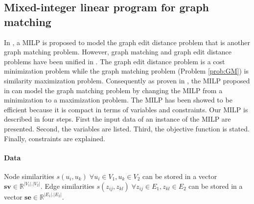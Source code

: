 \documentclass[times,onecolumn,final,authoryear]{article}
\theoremstyle{definition}
\begin{document}
\subsection{Mixed-integer linear program for graph matching}
In \cite{Lerouge2017NewBL}, a MILP is proposed to model the graph edit distance problem that is another graph matching problem. However, graph matching and graph edit distance problems have been unified in \cite{DBLP:journals/prl/Raveaux21}. The graph edit distance problem is a cost minimization problem while the graph matching problem (Problem \ref{prob:GM}) is similarity maximization problem.
Consequently as proven in \cite{DBLP:journals/prl/Raveaux21}, the MILP proposed in \cite{Lerouge2017NewBL} can model the graph matching problem by changing the MILP from a minimization to a maximization problem. The MILP has been showed to be efficient because it is compact in terms of variables and constraints. 
Our MILP is described in four steps. First the input data of an instance of the MILP are presented. Second, the variables are listed. Third, the objective function is stated. Finally, constraints are explained.

\paragraph{Data}
 Node similarities $s(u_i, u_k) \; \forall u_i \in V_1, u_k \in V_2$ can be stored in a vector $\mathbf{sv} \in \mathbb{R}^{|V_1|. |V_2|}$. Edge similarities $s(z_{ij}, z_{kl}) \; \forall z_{ij} \in E_1, z_{kl} \in E_2$ can be stored in a vector $\mathbf{se} \in \mathbb{R}^{|E_1|. |E_2|}$. 
 
\end{document}
